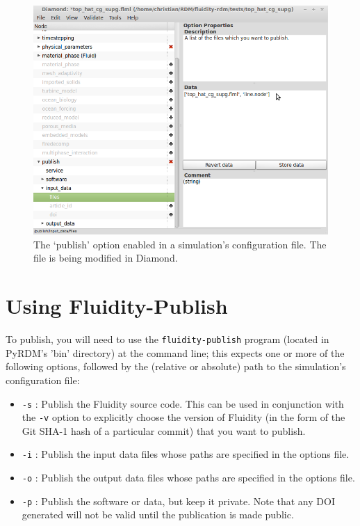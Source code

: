 \documentclass[a4paper,11pt]{report}
\begin{document}
\begin{figure}
  \centering
  \includegraphics[width=1\columnwidth]{images/diamond.png}
  \caption{The `publish' option enabled in a simulation's configuration file. The file is being modified in Diamond.}
  \label{fig:diamond}
\end{figure}

\section{Using Fluidity-Publish}
To publish, you will need to use the \texttt{fluidity-publish} program (located in PyRDM's 'bin' directory) at the command line; this expects one or more of the following options, followed by the (relative or absolute) path to the simulation's configuration file:
\begin{itemize}
   \item \texttt{-s} : Publish the Fluidity source code. This can be used in conjunction with the \texttt{-v} option to explicitly choose the version of Fluidity (in the form of the Git SHA-1 hash of a particular commit) that you want to publish.
   \item \texttt{-i} : Publish the input data files whose paths are specified in the options file.
   \item \texttt{-o} : Publish the output data files whose paths are specified in the options file.
   \item \texttt{-p} : Publish the software or data, but keep it private. Note that any DOI generated will not be valid until the publication is made public.
\end{itemize}
\end{document}
